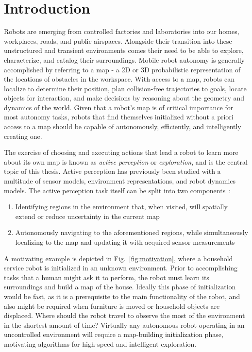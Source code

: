 \chapter{Introduction}

Robots are emerging from controlled factories and
laboratories into our homes, workplaces, roads, and public airspaces.
Alongside their transition into these unstructured and transient environments
comes their need to be able to explore, characterize, and catalog their surroundings.
Mobile robot autonomy is generally accomplished by referring to a map - a 2D or 3D
probabilistic representation of the locations of obstacles in the workspace.
With access to a map, robots can localize to determine their position, plan collision-free
trajectories to goals, locate objects for interaction, and make decisions by
reasoning about the geometry and dynamics of the world. Given that a robot's map
is of critical importance for most autonomy tasks, robots that find
themselves initialized without a priori access to a map should be capable of
autonomously, efficiently, and intelligently creating one.

The exercise of choosing and executing actions that lead a robot to learn more about its own
map is known as \textit{active perception} or \textit{exploration}, and
is the central topic of this thesis. Active perception has previously been studied with a
multitude of sensor models, environment representations, and robot dynamics
models. The active perception task itself can be split into two
components~\cite{shen20113d}:

\begin{enumerate}
  \item Identifying regions in the environment that, when visited, will
    spatially extend or reduce uncertainty in the current map
  \item Autonomously navigating to the aforementioned regions, while
    simultaneously localizing to the map and updating it with acquired sensor
    measurements
\end{enumerate}

A motivating example is depicted in Fig.~\ref{fig:motivation}, where a household
service robot is initialized in an unknown environment. Prior to accomplishing
tasks that a human might ask it to perform, the robot must learn its
surroundings and build a map of the house. Ideally this phase of
initialization would be fast, as it is a prerequisite to the main functionality
of the robot, and also might be required when furniture is moved or
household objects are displaced. Where should the robot travel to observe the
most of the environment in the shortest amount of time? Virtually any autonomous robot
operating in an uncontrolled environment will require a map-building
initialization phase, motivating algorithms for high-speed and intelligent
exploration.


